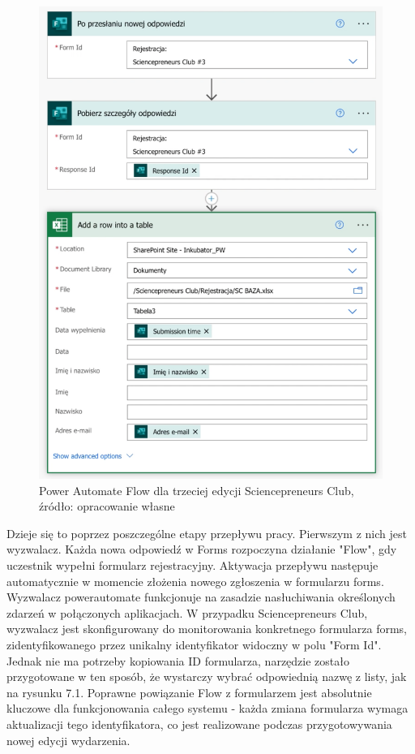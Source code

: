 \begin{figure}[!hb]
	\centering \includegraphics[width=0.7\linewidth]{rysunki/flow3.png}
	\caption{Power Automate Flow dla trzeciej edycji Sciencepreneurs Club, źródło: opracowanie własne }
\end{figure}

Dzieje się to poprzez poszczególne etapy przepływu pracy. 
Pierwszym z nich jest wyzwalacz. Każda nowa odpowiedź w Forms rozpoczyna działanie "Flow", gdy uczestnik wypełni formularz rejestracyjny. Aktywacja przepływu następuje automatycznie w momencie złożenia nowego zgłoszenia w formularzu \gls{forms}. \cite{microsoft_power_automate_2025} Wyzwalacz \gls{powerautomate} funkcjonuje na zasadzie nasłuchiwania określonych zdarzeń w połączonych aplikacjach. W przypadku Sciencepreneurs Club, wyzwalacz jest skonfigurowany do monitorowania konkretnego formularza \gls{forms}, zidentyfikowanego przez unikalny identyfikator widoczny w polu "Form Id". Jednak nie ma potrzeby kopiowania ID formularza, narzędzie zostało przygotowane w ten sposób, że wystarczy wybrać odpowiednią nazwę z listy, jak na rysunku 7.1. Poprawne powiązanie Flow z formularzem jest absolutnie kluczowe dla funkcjonowania całego systemu - każda zmiana formularza wymaga aktualizacji tego identyfikatora, co jest realizowane podczas przygotowywania nowej edycji wydarzenia.

